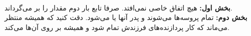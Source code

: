 \\
\textbf{بخش اول:}
هیچ اتفاق خاصی نمی‌افتد. صرفا تابع
بار دوم مقدار
را بر می‌گرداند.
\\\textbf{بخش دوم:}
تمام پروسه‌ها
می‌شوند و پدر آنها
 یا 
می‌شود. دقت کنید که
همیشه منتظر می‌ماند که کار پردازنده‌های فرزندش تمام شود و همیشه بر روی آن‌ها
می‌کند.






